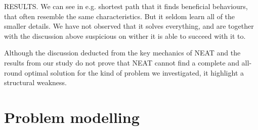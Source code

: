 

RESULTS. We can see in e.g. shortest path that it finds beneficial behaviours, that often resemble the same characteristics. But it seldom learn all of the smaller details. We have not observed that it solves everything, and are together with the discussion above suspicious on wither it is able to succeed with it to.

Although the discussion deducted from the key mechanics of NEAT and the results from our study do not prove that NEAT cannot find a complete and all-round optimal solution for the kind of problem we investigated, it highlight a structural weakness.



\section{Problem modelling}



